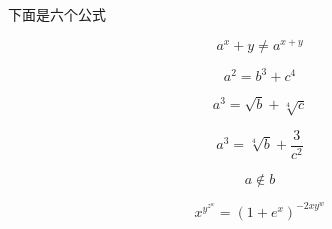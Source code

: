 \documentclass[UTF8]{ctexart}
\begin{document}
下面是六个公式

\begin{equation}
{a^{x}+y}\neq{a^{x+y}}
\end{equation}

\begin{equation}
a^{2}=b^{3}+c^{4}
\end{equation}

\begin{equation}
a^{3}=\sqrt{b}+\sqrt[4]{c}
\end{equation}

\begin{equation}
a^{3}=\sqrt[4]{b}+\frac{3}{c^{2}}
\end{equation}

\begin{equation}
a \notin{b}
\end{equation}

\begin{equation}
x^{y^{z^{w}}}=(1+e^{x})^{-2xy^w}
\end{equation}
\end{document}
